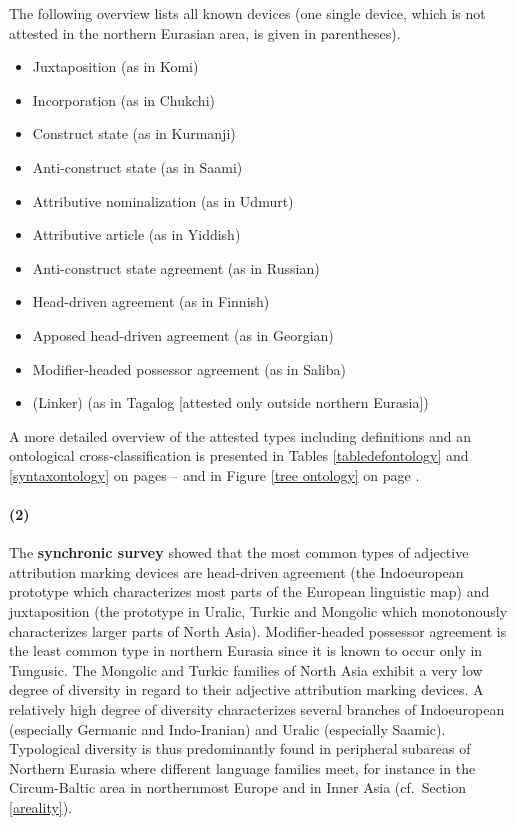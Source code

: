 The following overview lists all known devices (one single device, which is not attested in the northern Eurasian area, is given in parentheses).
\begin{itemize}
\item{Juxtaposition} (as in Komi)
\item{Incorporation} (as in Chukchi)
\item{Construct state} (as in Kurmanji)
\item{Anti-construct state} (as in Saami)
\item{Attributive nominalization} (as in Udmurt)
\item{Attributive article} (as in Yiddish)
\item{Anti-construct state agreement} (as in Russian)
\item{Head-driven agreement} (as in Finnish)
\item{Apposed head-driven agreement} (as in Georgian)
\item{Modifier-headed possessor agreement} (as in Saliba)
\item{(Linker)} (as in Tagalog [attested only outside northern Eurasia])
\end{itemize}
A more detailed overview of the attested types including definitions and an ontological cross-classification is presented in Tables \ref{tabledefontology} and \ref{syntaxontology} on pages \pageref{tabledefontology}–\pageref{syntaxontology} and in Figure \ref{tree ontology} on page \pageref{tree ontology}.

\paragraph{(2)} The {\bf synchronic survey} showed that the most common types of adjective attribution marking devices are head-driven agreement (the Indoeuropean prototype which characterizes most parts of the European linguistic map) and juxtaposition (the prototype in Uralic, Turkic and Mongolic which monotonously characterizes larger parts of North Asia). Modifier-headed possessor agreement is the least common type in northern Eurasia since it is known to occur only in Tungusic. The Mongolic and Turkic families of North Asia exhibit a very low degree of diversity in regard to their adjective attribution marking devices. A relatively high degree of diversity characterizes several branches of Indoeuropean (especially Germanic and Indo-Iranian) and Uralic (especially Saamic). Typological diversity is thus predominantly found in peripheral subareas of Northern Eurasia where different language families meet, for instance in the Circum-Baltic area in northernmost Europe and in Inner Asia (cf.~Section \ref{areality}).

